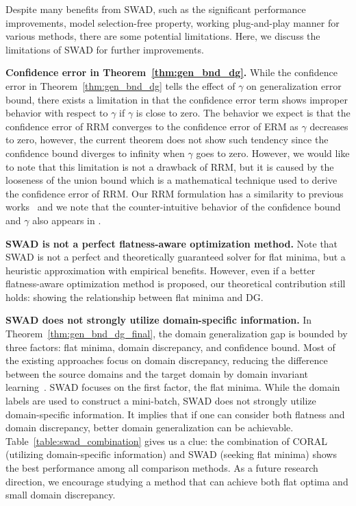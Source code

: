Despite many benefits from SWAD, such as the significant performance improvements, model selection-free property, working plug-and-play manner for various methods, there are some potential limitations.
Here, we discuss the limitations of SWAD for further improvements.

\textbf{Confidence error in Theorem~\ref{thm:gen_bnd_dg}.}
While the confidence error in Theorem~\ref{thm:gen_bnd_dg} tells the effect of $\gamma$ on generalization error bound, there exists a limitation in that the confidence error term shows improper behavior with respect to $\gamma$ if $\gamma$ is close to zero. The behavior we expect is that the confidence error of RRM converges to the confidence error of ERM as $\gamma$ decreases to zero, however, the current theorem does not show such tendency since the confidence bound diverges to infinity when $\gamma$ goes to zero. However, we would like to note that this limitation is not a drawback of RRM, but it is caused by the looseness of the union bound which is a mathematical technique used to derive the confidence error of RRM.
Our RRM formulation has a similarity to previous works~\cite{norton2019diametrical, foret2020sharpness} and we note that the counter-intuitive behavior of the confidence bound and $\gamma$ also appears in \citet{foret2020sharpness}.

\textbf{SWAD is not a perfect flatness-aware optimization method.}
Note that SWAD is not a perfect and theoretically guaranteed solver for flat minima, but a heuristic approximation with empirical benefits.
However, even if a better flatness-aware optimization method is proposed, our theoretical contribution still holds: showing the relationship between flat minima and DG.


\textbf{SWAD does not strongly utilize domain-specific information.}
In Theorem~\ref{thm:gen_bnd_dg_final}, the domain generalization gap is bounded by three factors: flat minima, domain discrepancy, and confidence bound. Most of the existing approaches focus on domain discrepancy, reducing the difference between the source domains and the target domain by domain invariant learning~\cite{muandet2013icml_DIFL,ganin2016dann,li2018cdann,bahng2019rebias,zhao2020er_entropy_regularization}.
SWAD focuses on the first factor, the flat minima. While the domain labels are used to construct a mini-batch, SWAD does not strongly utilize domain-specific information. It implies that if one can consider both flatness and domain discrepancy, better domain generalization can be achievable.
Table~\ref{table:swad_combination} gives us a clue: the combination of CORAL (utilizing domain-specific information) and SWAD (seeking flat minima) shows the best performance among all comparison methods.
As a future research direction, we encourage studying a method that can achieve both flat optima and small domain discrepancy.

